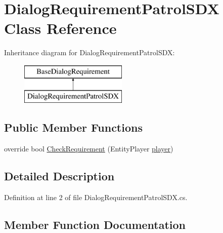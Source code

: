 \hypertarget{class_dialog_requirement_patrol_s_d_x}{}\section{Dialog\+Requirement\+Patrol\+S\+DX Class Reference}
\label{class_dialog_requirement_patrol_s_d_x}
Inheritance diagram for Dialog\+Requirement\+Patrol\+S\+DX\+:\begin{figure}[H]
\begin{center}
\leavevmode
\includegraphics[height=2.000000cm]{df/dfa/class_dialog_requirement_patrol_s_d_x}
\end{center}
\end{figure}
\subsection*{Public Member Functions}
\begin{DoxyCompactItemize}
\item 
override bool \mbox{\hyperlink{class_dialog_requirement_patrol_s_d_x_a362acf9934977c6fe46601499cd7e21c}{Check\+Requirement}} (Entity\+Player \mbox{\hyperlink{_sphere_i_i_01_music_01_boxes_2_config_2_localization_8txt_a4e2cb8aeff651600ea1cc57fe5a929a4}{player}})
\end{DoxyCompactItemize}


\subsection{Detailed Description}


Definition at line 2 of file Dialog\+Requirement\+Patrol\+S\+D\+X.\+cs.



\subsection{Member Function Documentation}
\mbox{\label{class_dialog_requirement_patrol_s_d_x_a362acf9934977c6fe46601499cd7e21c}} 
